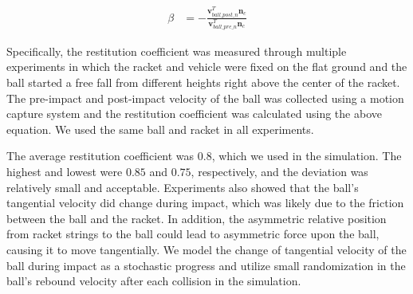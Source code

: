 \begin{align}
\beta &= -\frac{\bm{v}_{ball\_post\_n}^T\bm{n}_c}{\bm{v}_{ball\_pre\_n}^T\bm{n}_c}
\end{align}

Specifically, the restitution coefficient was measured through multiple experiments in which the racket and vehicle were fixed on the flat ground and the ball started a free fall from different heights right above the center of the racket. The pre-impact and post-impact velocity of the ball was collected using a motion capture system and the restitution coefficient was calculated using the above equation. We used the same ball and racket in all experiments.

The average restitution coefficient was $0.8$, which we used in the simulation. The highest and lowest were $0.85$ and $0.75$, respectively, and the deviation was relatively small and acceptable. Experiments also showed that the ball’s tangential velocity did change during impact, which was likely due to the friction between the ball and the racket. In addition, the asymmetric relative position from racket strings to the ball could lead to asymmetric force upon the ball, causing it to move tangentially. We model the change of tangential velocity of the ball during impact as a stochastic progress and utilize small randomization in the ball's rebound velocity after each collision in the simulation.
